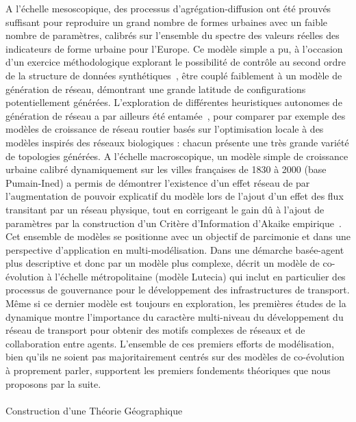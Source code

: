 A l'échelle mesoscopique, des processus d'agrégation-diffusion ont été prouvés suffisant pour reproduire un grand nombre de formes urbaines avec un faible nombre de paramètres, calibrés sur l'ensemble du spectre des valeurs réelles des indicateurs de forme urbaine pour l'Europe. Ce modèle simple a pu, à l'occasion d'un exercice méthodologique explorant le possibilité de contrôle au second ordre de la structure de données synthétiques~\cite{raimbault2016generation}, être couplé faiblement à un modèle de génération de réseau, démontrant une grande latitude de configurations potentiellement générées. L'exploration de différentes heuristiques autonomes de génération de réseau a par ailleurs été entamée~\cite{raimbault2015labex}, pour comparer par exemple des modèles de croissance de réseau routier basés sur l'optimisation locale à des modèles inspirés des réseaux biologiques : chacun présente une très grande variété de topologies générées. A l'échelle macroscopique, un modèle simple de croissance urbaine calibré dynamiquement sur les villes françaises de 1830 à 2000 (base Pumain-Ined) a permis de démontrer l'existence d'un effet réseau de par l'augmentation de pouvoir explicatif du modèle lors de l'ajout d'un effet des flux transitant par un réseau physique, tout en corrigeant le gain dû à l'ajout de paramètres par la construction d'un Critère d'Information d'Akaike empirique~\cite{raimbault2016models}. Cet ensemble de modèles se positionne avec un objectif de parcimonie et dans une perspective d'application en multi-modélisation. Dans une démarche basée-agent plus descriptive et donc par un modèle plus complexe, \cite{le2015modeling} décrit un modèle de co-évolution à l'échelle métropolitaine (modèle Lutecia) qui inclut en particulier des processus de gouvernance pour le développement des infrastructures de transport. Même si ce dernier modèle est toujours en exploration, les premières études de la dynamique montre l'importance du caractère multi-niveau du développement du réseau de transport pour obtenir des motifs complexes de réseaux et de collaboration entre agents. L'ensemble de ces premiers efforts de modélisation, bien qu'ils ne soient pas majoritairement centrés sur des modèles de co-évolution à proprement parler, supportent les premiers fondements théoriques que nous proposons par la suite.



\paragraph{}{Construction d'une Théorie Géographique}

